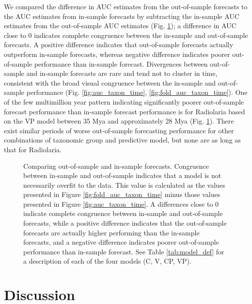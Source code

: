 \documentclass[12pt,letterpaper]{article}
\begin{document}
\begin{refsection}
We compared the difference in AUC estimates from the out-of-sample forecasts to the AUC estimates from in-sample forecasts by subtracting the in-sample AUC estimates from the out-of-sample AUC estimates (Fig. \ref{fig:oos_ins_diff}); a difference in AUC close to 0 indicates complete congruence between the in-sample and out-of-sample forecasts. A positive difference indicates that out-of-sample forecasts actually outperform in-sample forecasts, whereas negative difference indicates poorer out-of-sample performance than in-sample forecast. Divergences between out-of-sample and in-sample forecasts are rare and tend not to cluster in time, consistent with the broad visual congruence between the in-sample and out-of-sample performance (Fig. \ref{fig:auc_taxon_time}, \ref{fig:fold_auc_taxon_time}). One of the few multimillion year pattern indicating significantly poorer out-of-sample forecast performance than in-sample forecast performance is for Radiolaria based on the VP model between 35 Mya and approximately 28 Mya (Fig. \ref{fig:oos_ins_diff}). There exist similar periods of worse out-of-sample forecasting performance for other combinations of taxonomic group and predictive model, but none are as long as that for Radiolaria.

\begin{figure}[ht]
 \centering
 \caption{Comparing out-of-sample and in-sample forecasts. Congruence between in-sample and out-of-sample indicates that a model is not necessarily overfit to the data. This value is calculated as the values presented in Figure \ref{fig:fold_auc_taxon_time} minus those values presented in Figure \ref{fig:auc_taxon_time}. A differences close to 0 indicate complete congruence between in-sample and out-of-sample forecasts, while a positive difference indicates that the out-of-sample forecasts are actually higher performing than the in-sample forecasts, and a negative difference indicates poorer out-of-sample performance than in-sample forecast. See Table \ref{tab:model_def} for a description of each of the four models (C, V, CP, VP).}
 \label{fig:oos_ins_diff}
\end{figure}




\section{Discussion}


\end{refsection}
\end{document}
